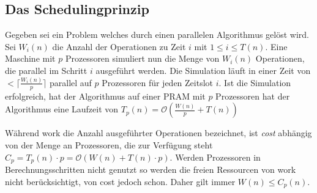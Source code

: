 \subsection{Das Schedulingprinzip}
Gegeben sei ein Problem welches durch einen parallelen Algorithmus gelöst wird.
Sei $W_i(n)$ die Anzahl der Operationen zu Zeit $i$ mit $1 \leq i \leq T(n)$.
Eine Maschine mit $p$ Prozessoren simuliert nun die Menge von $W_i(n)$
Operationen, die parallel im Schritt $i$ ausgeführt werden.
Die Simulation läuft in einer Zeit von $< \lceil \frac{W_i(n)}{p} \rceil$
parallel auf $p$ Prozessoren für jeden Zeitslot $i$.
Ist die Simulation erfolgreich, hat der Algorithmus auf einer PRAM mit $p$
Prozessoren hat der Algorithmus eine Laufzeit von
$T_p(n) = \mathcal{O} \left( \frac{W(n)}{p} + T(n) \right)$
\cite[S.28]{jaja}

Während work die Anzahl ausgeführter Operationen bezeichnet, ist \emph{cost}
abhängig von der Menge an Prozessoren, die zur Verfügung steht
$C_p = T_p(n) \cdot p = \mathcal{O} (W(n) + T(n) \cdot p)$.
Werden Prozessoren in Berechnungsschritten nicht genutzt so werden die freien
Ressourcen von work nicht berücksichtigt, von cost jedoch schon.
Daher gilt immer $W(n) \leq C_p(n)$.
\cite[S.31]{jaja}

